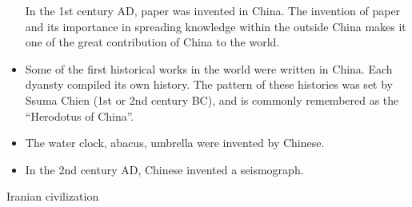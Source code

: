 \documentclass[
  openany]{book}
\begin{document}
\begin{itemize}
  In the 1st century AD, paper was invented in China. The invention of paper and its importance in spreading knowledge within the outside China makes it one of the great contribution of China to the world.
\item
  Some of the first historical works in the world were written in China. Each dyansty compiled its own history. The pattern of these histories was set by Ssuma Chien (1st or 2nd century BC), and is commonly remembered as the ``Herodotus of China''.
\item
  The water clock, abacus, umbrella were invented by Chinese.
\item
  In the 2nd century AD, Chinese invented a seismograph.
\end{itemize}

Iranian civilization
\end{document}
